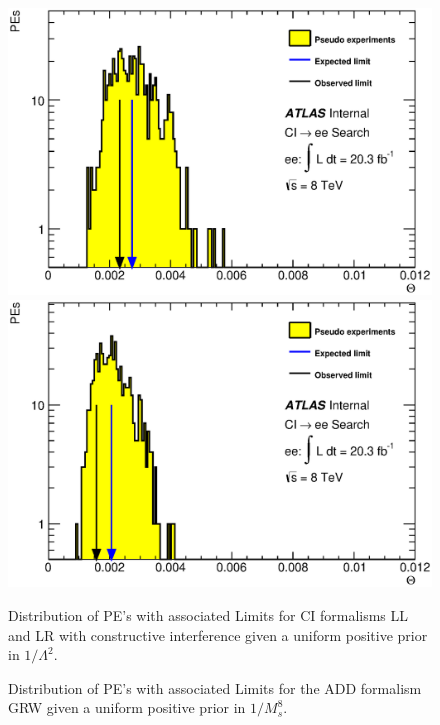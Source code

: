     \begin{figure}[h]
        \begin{center}
            \includegraphics[scale=0.4]{images/ee__LL_minus_L2/Theta.eps}
            \includegraphics[scale=0.4]{images/ee__LR_minus_L2/Theta.eps}
        \end{center}
       \caption{Distribution of PE's with associated Limits for CI formalisms LL and LR with constructive interference given a uniform positive prior in $1/\Lambda^{2}$.}
       \label{fig:Theta_CI_main}
    \end{figure}

    \begin{figure}[h]
        \begin{center}
        \end{center}
       \caption{Distribution of PE's with associated Limits for the ADD formalism GRW given a uniform positive prior in $1/M_{s}^{8}$.}
       \label{fig:Theta_ADD_main}
    \end{figure}



